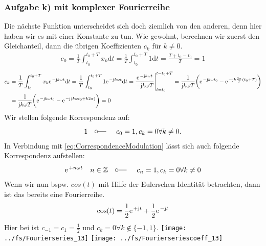 \documentclass[11pt,a4paper,DIV=12]{scrartcl}
\newcommand{\diff}{\mathrm{d}}
\begin{document}
\subsubsection*{Aufgabe k) mit komplexer Fourierreihe}
Die nächste Funktion unterscheidet sich doch ziemlich von den anderen, denn hier haben wir es mit einer Konstante zu tun.
Wie gewohnt, berechnen wir zuerst den Gleichanteil, dann die übrigen Koeffizienten $c_k$ für $k\neq 0$.
\begin{align}
	c_0=\frac{1}{T}\int_{t_0}^{t_0+T}x_{k}\diff t=\frac{1}{T}\int_{t_0}^{t_0+T}1\diff t=\frac{T+t_0-t_0}{T}=1
\end{align}
\begin{align}
	c_k&=\frac{1}{T}\int_{t_0}^{t_0+T}x_{k}\e^{-\im k \omega t}\diff t=\frac{1}{T}\int_{t_0}^{t_0+T}1\e^{-\im k \omega t}\diff t=\frac{\e^{-\im k \omega t}}{-\im k \omega T}\Bigg |_{t=t_0}^{t=t_0+T}=\frac{1}{\im k \omega T}\bigg (\e^{-\im k \omega t_0}-\e^{-\im k \frac{2\pi}{T}(t_0+T)}\bigg )\nonumber \\
	&=\frac{1}{\im k \omega T}\bigg (\e^{-\im k \omega t_0}-\e^{-\im (k \omega t_0+k2\pi )}\bigg )=0
\end{align}
Wir stellen folgende Korrespondenz auf:
\begin{align}
	1 \quad \fourier \quad c_0 = 1,c_k=0\forall k \neq 0.
\end{align}
In Verbindung mit \eqref{eq:CorrespondenceModulation} lässt sich auch folgende Korrespondenz aufstellen:
\begin{align}
	\e^{+n\omega t}\quad n\in\mathbb{Z}\quad \fourier\quad c_n=1,c_k=0\forall k\neq 0
\end{align}
Wenn wir nun bspw. $cos(t)$ mit Hilfe der Eulerschen Identität betrachten, dann ist das bereits eine Fourierreihe.
\begin{align}
	\cos(t)=\frac{1}{2}\e^{+\im t}+\frac{1}{2}\e^{-\im t}
\end{align}
Hier bei ist $c_{-1}=c_1=\frac{1}{2}$ und $c_k=0\forall k \not\in\{-1,1\}$.
\newpage
\texttt{[image: ../fs/Fourierseries\_13]}
\texttt{[image: ../fs/Fourierseriescoeff\_13]}
\newpage
\end{document}

